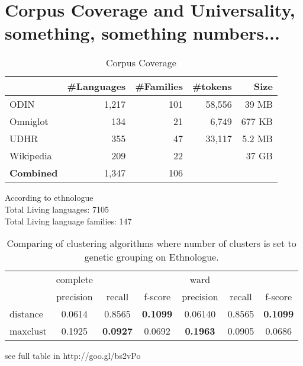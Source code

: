 % 

\section{Corpus Coverage and Universality, something, something numbers...}

\begin{table}[h!]
\centering
    \begin{tabular}{l|rrrr}
    ~         				& \#Languages & \#Families 	&\#tokens		& Size	\\ \hline
    ODIN      				& 1,217      & 101       		& 58,556		& 39 MB		\\
    Omniglot  				& 134        & 21        		&	6,749			& 677 KB	\\
    UDHR      				& 355        & 47        		&	33,117		& 5.2 MB	\\
    Wikipedia 				& 209        & 22       		&						& 37 GB		\\ \hline
    \textbf{Combined}	& 1,347			 & 106 
    \end{tabular}
\caption{Corpus Coverage}
\end{table}

\noindent
According to ethnologue \\
Total Living languages: 7105 \\
Total Living language families: 147 \\

\begin{table}[h!]
    \begin{tabular}{l|ccc|ccc}
    ~        & complete & ~       & ~       & ward    & ~       & ~       \\ \cline{2-7}
    ~        & precision & recall       & f-score       & precision    & recall       & f-score      \\ \hline
    distance & 0.0614   & 0.8565 & \textbf{0.1099} & 0.06140  & 0.8565 & \textbf{0.1099} \\
    maxclust & 0.1925  & \textbf{0.0927} & 0.0692 & \textbf{0.1963} & 0.0905 & 0.0686  \\
    \end{tabular}
\caption{Comparing of clustering algorithms where number of clusters is set to genetic grouping on Ethnologue.}
\end{table}

\noindent
see full table in http://goo.gl/bs2vPo


%

